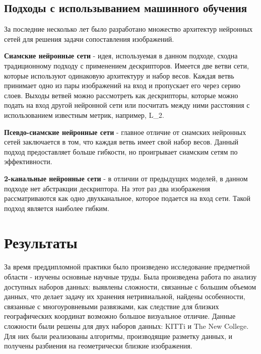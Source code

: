 \documentclass[12pt, specialist, subf, substylefile = spbu.rtx]{disser}
\begin{document}
\subsection{Подходы с использыванием машинного обучения}
За последние несколько лет было разработано множество архитектур нейронных сетей для решения задачи сопоставления изображений.
\par \textbf{Сиамские нейронные сети} - идея, используемая в данном подходе, сходна традиционному подходу с применением дескрипторов. Имеется две ветви сети, которые используют одинаковую архитектуру и набор весов. Каждая ветвь принимает одно из пары изображений на вход и пропускает его через серию слоев. Выходы ветвей можно рассмотреть как дескрипторы, которые можно подать на вход другой нейронной сети или посчитать между ними расстояния с использованием известным метрик, например, L_2.
\par \textbf{Псевдо-сиамские нейронные сети} - главное отличие от сиамских нейронных сетей заключается в том, что каждая ветвь имеет свой набор весов. Данный подход предоставляет больше гибкости, но проигрывает сиамским сетям по эффективности.
\par \textbf{2-канальные нейронные сети} - в отличии от предыдущих моделей, в данном подходе нет абстракции дескриптора. На этот раз два изображения рассматриваются как одно двухканальное, которое подается на вход сети. Такой подход является наиболее гибким.
\newpage
\section{Результаты}
За время преддипломной практики было произведено исследование предметной области - изучены основные научные труды. Была произведена работа по анализу доступных наборов данных: выявлены сложности, связанные с большим объемом данных, что делает задачу их хранения нетривиальной, найдены особенности, связанные с многоуровневыми развязками, как следствие для близких географических координат возможно большое визуальное отличие. Данные сложности были решены для двух наборов данных: KITTi и The New College. Для них были реализованы алгоритмы, производящие разметку данных, и получены разбиения на геометрически близкие изображения.
\end{document}
